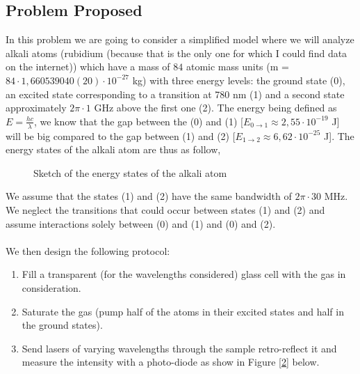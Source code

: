 \documentclass[10pt,a4paper]{article}
\begin{document}
\subsection{Problem Proposed}

In this problem we are going to consider a simplified model where we will analyze alkali atoms (rubidium (because that is the only one for which I could find data on the internet)) which have a mass of $84$ atomic mass units (m = $84 \cdot 1,660539040(20) \cdot 10^{-27}$ kg) with three energy levels: the ground state (0), an excited state corresponding to a transition at 780 nm (1) and a second state approximately $2\pi \cdot 1$ GHz above the first one (2). The energy being defined as $E = \frac{hc}{\lambda}$, we know that the gap between the (0) and (1) [$E_{0\rightarrow 1} \approx 2,55\cdot 10^{-19}$ J] will be big compared to the gap between (1) and (2) [$E_{1\rightarrow 2} \approx 6,62\cdot 10^{-25}$ J]. The energy states of the alkali atom are thus as follow,

\begin{figure}[h!]
    \centering
    \caption{Sketch of the energy states of the alkali atom}
\end{figure}

We assume that the states (1) and (2) have the same bandwidth of $2\pi \cdot 30$ MHz. We neglect the transitions that could occur between states (1) and (2) and assume interactions solely between (0) and (1) and (0) and (2). \\ \\
We then design the following protocol:
\begin{enumerate}
\item Fill a transparent (for the wavelengths considered) glass cell with the gas in consideration.
\item Saturate the gas (pump half of the atoms in their excited states and half in the ground states).
\item Send lasers of varying wavelengths through the sample retro-reflect it and measure the intensity with a photo-diode as show in Figure \ref{2} below.
\end{enumerate}
\end{document}
